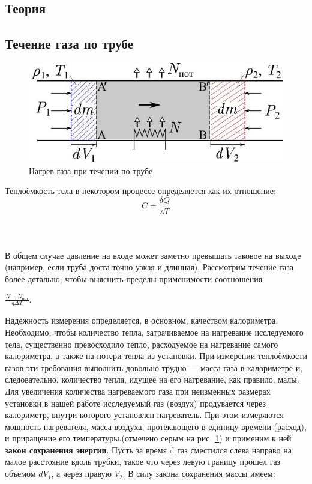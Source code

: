 \documentclass[a4paper,12pt]{article}
\theoremstyle{plain} %
\theoremstyle{definition} %
\theoremstyle{remark} %
\begin{document}
\subsection{Теория}

\subsection{Течение газа по трубе}
\begin{figure} \label{pic:sheme}
	\includegraphics[width=0.8\linewidth]{pic2.jpg}
	\caption{Нагрев газа при течении по трубе}
\end{figure}
Теплоёмкость тела в некотором процессе определяется как их отношение:
\begin{equation}
C = \dfrac{\delta Q}{\vartriangle T}
\end{equation}\\[5ex]
\\
\\
В общем случае давление на входе может заметно превышать таковое на выходе (например, если труба доста-точно узкая и длинная). Рассмотрим течение газа более детально, чтобы выяснить пределы применимости соотношения \begin{large}
 $\frac{N - N_\text{пот}}{q\Delta T}$. 
\end{large}

Надёжность измерения определяется, в основном, качеством калориметра. Необходимо, чтобы количество тепла, затрачиваемое на нагревание исследуемого тела, существенно превосходило тепло, расходуемое на нагревание самого калориметра, а также на потери тепла из установки. При измерении теплоёмкости газов эти требования выполнить довольно трудно — масса газа в калориметре и, следовательно, количество тепла, идущее на его нагревание, как правило, малы. Для увеличения количества нагреваемого газа при неизменных размерах установки в нашей работе исследуемый газ (воздух) продувается через калориметр, внутри которого установлен нагреватель. При этом измеряются мощность нагревателя, масса воздуха, протекающего в единицу времени (расход), и приращение его температуры.(отмечено серым на рис. \ref{pic:sheme}) и применим к ней \textbf{закон сохранения энергии}.
Пусть за время d газ сместился слева направо на малое расстояние вдоль трубки, такое что через левую границу прошёл газ объёмом $dV_1$, а через правую $V_2$. В силу закона сохранения массы имеем:
\end{document}
